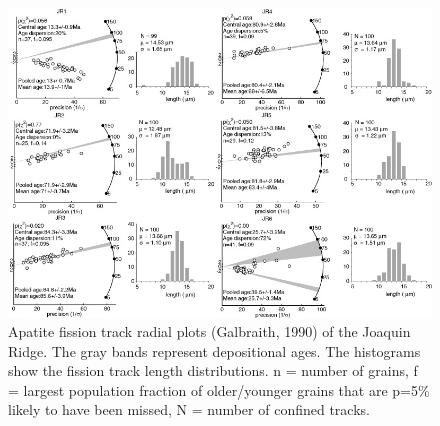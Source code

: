\documentclass[11pt,twoside]{article}
\begin{document}
\begin{figure}[here]
  \centering
  \includegraphics[width=400pt]{AFT.jpg}
  \caption{
Apatite fission  track radial plots  (Galbraith, 1990) of  the Joaquin
Ridge.  The  gray bands  represent depositional ages.   The histograms
show the fission track length distributions. n = number of grains, f =
largest  population fraction  of older/younger  grains that  are p=5\%
likely to have been missed, N = number of confined tracks.}
\label{fig:AFTages}
\end{figure}
\end{document}
